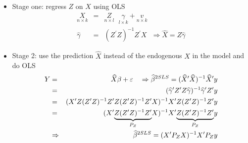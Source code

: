 \documentclass[notes=show]{beamer}
\begin{document}
\begin{frame}%


\begin{itemize}
\item Stage one: regress $Z$ on $X$ using OLS%
\begin{eqnarray*}
\underset{n\times k}{X} &=&\underset{n\times l}{Z}\text{ }\underset{l\times k%
}{\gamma }+\underset{n\times k}{v} \\
\widehat{\gamma } &=&(Z^{\prime }Z)^{-1}Z^{\prime }X\text{ \ }\Rightarrow 
\widehat{X}=Z\widehat{\gamma }
\end{eqnarray*}

\item Stage 2: use the prediction $\widehat{X}$ instead of the endogenous $X$
in the model and do OLS%
\begin{eqnarray*}
Y &=&\widehat{X}\beta +\varepsilon \text{ \ \ }\Rightarrow \widehat{\beta }%
^{2SLS}=(\widehat{X}^{\prime }\widehat{X})^{-1}\widehat{X}^{\prime }y \\
&=&(\widehat{\gamma }^{\prime }Z^{\prime }Z\widehat{\gamma })^{-1}\widehat{%
\gamma }^{\prime }Z^{\prime }y \\
&=&(X^{\prime }Z(Z^{\prime }Z)^{-1}Z^{\prime }Z(Z^{\prime }Z)^{-1}Z^{\prime
}X)^{-1}X^{\prime }Z(Z^{\prime }Z)^{-1}Z^{\prime }y \\
&=&(X^{\prime }\underset{P_{Z}}{\underbrace{Z(Z^{\prime }Z)^{-1}Z^{\prime }}}%
X)^{-1}X^{\prime }\underset{P_{Z}}{\underbrace{Z(Z^{\prime }Z)^{-1}Z^{\prime
}}}y \\
&\Rightarrow &\widehat{\beta }^{2SLS}=(X^{\prime }P_{Z}X)^{-1}X^{\prime
}P_{Z}y
\end{eqnarray*}
\end{itemize}

\end{frame}%
\end{document}
